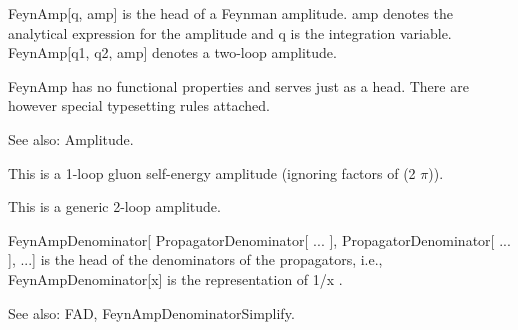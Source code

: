 FeynAmp[q, amp] is the head of a Feynman amplitude. amp denotes the analytical expression for the amplitude and q is the integration
  variable. FeynAmp[q1, q2, amp] denotes a two-loop amplitude.

FeynAmp has no functional properties and serves just as a head. There are however special typesetting rules attached.

See also:  Amplitude.


This is a 1-loop gluon self-energy amplitude (ignoring factors of (2 \(\pi \))).



This is a generic 2-loop amplitude.





FeynAmpDenominator[ PropagatorDenominator[ ... ], PropagatorDenominator[ ... ], ...] is the head of the denominators of the propagators,
  i.e., FeynAmpDenominator[x] is the representation of 1/x .

See also:  FAD, FeynAmpDenominatorSimplify.




